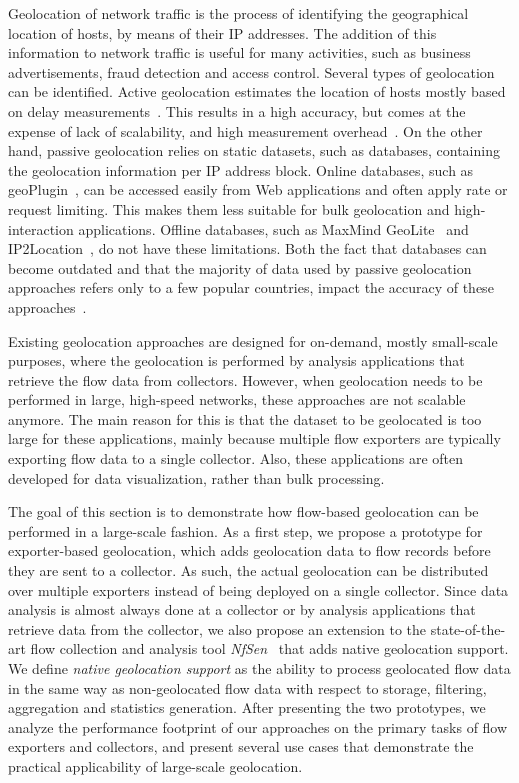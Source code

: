 Geolocation of network traffic is the process of identifying the geographical location of hosts, by means of their IP addresses. The addition of this information to network traffic is useful for many activities, such as business advertisements, fraud detection and access control. Several types of geolocation can be identified. Active geolocation estimates the location of hosts mostly based on delay measurements~\cite{Katz-Bassett-2006-Towards, Eriksson-2010-Learning}. This results in a high accuracy, but comes at the expense of lack of scalability, and high measurement overhead~\cite{Poese-2011-IP}. On the other hand, passive geolocation relies on static datasets, such as databases, containing the geolocation information per IP address block. Online databases, such as geoPlugin~\cite{--geoPlugin}, can be accessed easily from Web applications and often apply rate or request limiting. This makes them less suitable for bulk geolocation and high-interaction applications. Offline databases, such as MaxMind GeoLite~\cite{MaxMind--GeoLite} and IP2Location~\cite{IP2Location--IP}, do not have these limitations. Both the fact that databases can become outdated and that the majority of data used by passive geolocation approaches refers only to a few popular countries, impact the accuracy of these approaches~\cite{Poese-2011-IP}.
 
Existing geolocation approaches are designed for on-demand, mostly small-scale purposes, where the geolocation is performed by analysis applications that retrieve the flow data from collectors. However, when geolocation needs to be performed in large, high-speed networks, these approaches are not scalable anymore. The main reason for this is that the dataset to be geolocated is too large for these applications, mainly because multiple flow exporters are typically exporting flow data to a single collector. Also, these applications are often developed for data visualization, rather than bulk processing.

The goal of this section is to demonstrate how flow-based geolocation can be performed in a large-scale fashion. As a first step, we propose a prototype for exporter-based geolocation, which adds geolocation data to flow records before they are sent to a collector. As such, the actual geolocation can be distributed over multiple exporters instead of being deployed on a single collector. Since data analysis is almost always done at a collector or by analysis applications that retrieve data from the collector, we also propose an extension to the state-of-the-art flow collection and analysis tool \textit{NfSen}~\cite{Haag-2011-NfSen} that adds native geolocation support. We define \textit{native geolocation support} as the ability to process geolocated flow data in the same way as non-geolocated flow data with respect to storage, filtering, aggregation and statistics generation. After presenting the two prototypes, we analyze the performance footprint of our approaches on the primary tasks of flow exporters and collectors, and present several use cases that demonstrate the practical applicability of large-scale geolocation.

